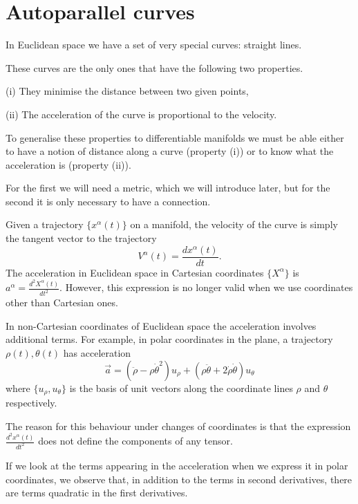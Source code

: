 \section{Autoparallel curves}

\begin{points}
\item In Euclidean space we have a set of very special curves: straight lines.

\item These curves are the only ones that have the following two properties.

(i) They minimise the distance between two given points,

(ii) The acceleration of the curve is proportional to the velocity.

\item To generalise these properties to differentiable manifolds we must be able either to have a notion of distance along a curve (property (i)) or to know what the acceleration is (property (ii)).

\item For the first we will need a metric, which we will introduce later, but for the second it is only necessary to have a connection.

\item Given a trajectory $\{x^\alpha(t)\}$ on a manifold, the velocity of the curve is simply the tangent vector to the trajectory
\[
  V^\alpha(t)=\frac{dx^\alpha(t)}{dt} .
\]
The acceleration in Euclidean space in Cartesian coordinates $\{X^\alpha\}$ is $a^\alpha=\frac{d^2X^\alpha(t)}{dt^2}$. However, this expression is no longer valid when we use coordinates other than Cartesian ones.

\item In non-Cartesian coordinates of Euclidean space the acceleration involves additional terms. For example, in polar coordinates in the plane, a trajectory $\rho(t),\theta(t)$ has acceleration
\[
  \vec a=\left(\ddot\rho-\rho\dot\theta^2\right)u_\rho+\left(\rho\ddot\theta+2\dot\rho\dot\theta\right)u_\theta
\]
where $\{u_\rho,u_\theta\}$ is the basis of unit vectors along the coordinate lines $\rho$ and $\theta$ respectively.

\item The reason for this behaviour under changes of coordinates is that the expression $\frac{d^2x^\alpha(t)}{dt^2}$ does not define the components of any tensor.

\item If we look at the terms appearing in the acceleration when we express it in polar coordinates, we observe that, in addition to the terms in second derivatives, there are terms quadratic in the first derivatives.


\end{points}
